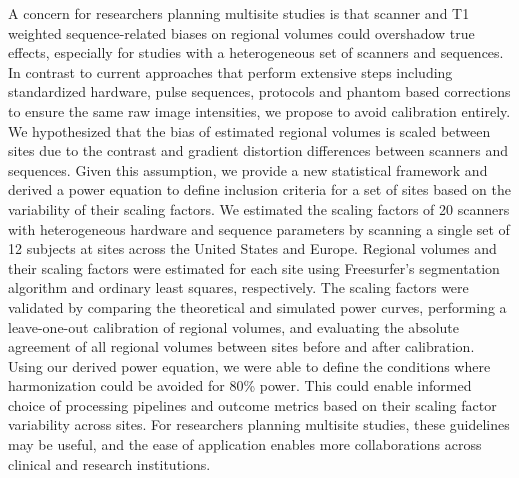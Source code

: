 
A concern for researchers planning multisite studies is that scanner and T1 weighted sequence-related biases on regional volumes could overshadow true effects, especially for studies with a heterogeneous set of scanners and sequences. In contrast to current approaches that perform extensive steps including standardized hardware, pulse sequences, protocols and phantom based corrections to ensure the same raw image intensities, we propose to avoid calibration entirely.  We hypothesized that the bias of estimated regional volumes is scaled between sites due to the contrast and gradient distortion differences between scanners and sequences. Given this assumption, we provide a new statistical framework and derived a power equation to define inclusion criteria for a set of sites based on the variability of their scaling factors. We estimated the scaling factors of 20 scanners with heterogeneous hardware and sequence parameters by scanning a single set of 12 subjects at sites across the United States and Europe. Regional volumes and their scaling factors were estimated for each site using Freesurfer's segmentation algorithm and ordinary least squares, respectively. The scaling factors were validated by comparing the theoretical and simulated power curves, performing a leave-one-out calibration of regional volumes, and evaluating the absolute agreement of all regional volumes between sites before and after calibration. Using our derived power equation, we were able to define the conditions where harmonization could be avoided for 80\% power. This could enable informed choice of processing pipelines and outcome metrics based on their scaling factor variability across sites. For researchers planning multisite studies, these guidelines may be useful, and the ease of application enables more collaborations across clinical and research institutions.